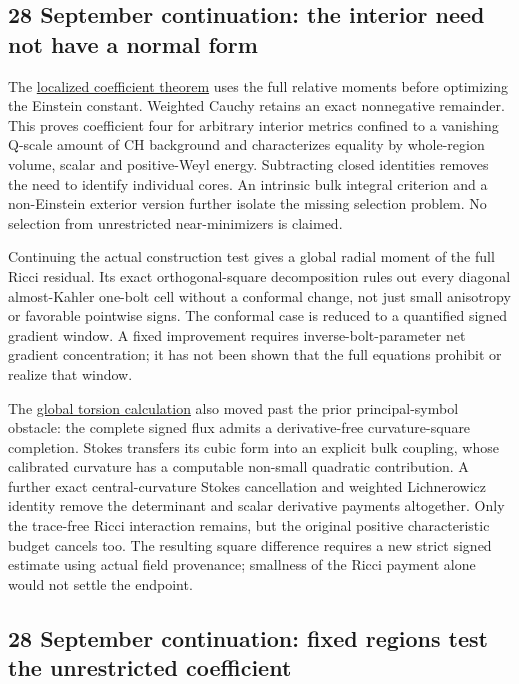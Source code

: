 \documentclass[
  10pt,
]{article}
\begin{document}
\hypertarget{september-continuation-the-interior-need-not-have-a-normal-form}{%
\subsection{28 September continuation: the interior need not have a
normal
form}\label{september-continuation-the-interior-need-not-have-a-normal-form}}

The
\href{../continuation/20260928_localization_and_coupled_filling.md}{localized
coefficient theorem} uses the full relative moments before optimizing
the Einstein constant. Weighted Cauchy retains an exact nonnegative
remainder. This proves coefficient four for arbitrary interior metrics
confined to a vanishing Q-scale amount of CH background and
characterizes equality by whole-region volume, scalar and positive-Weyl
energy. Subtracting closed identities removes the need to identify
individual cores. An intrinsic bulk integral criterion and a
non-Einstein exterior version further isolate the missing selection
problem. No selection from unrestricted near-minimizers is claimed.

Continuing the actual construction test gives a global radial moment of
the full Ricci residual. Its exact orthogonal-square decomposition rules
out every diagonal almost-Kahler one-bolt cell without a conformal
change, not just small anisotropy or favorable pointwise signs. The
conformal case is reduced to a quantified signed gradient window. A
fixed improvement requires inverse-bolt-parameter net gradient
concentration; it has not been shown that the full equations prohibit or
realize that window.

The \href{../continuation/20260928_signed_quartic_flux.md}{global
torsion calculation} also moved past the prior principal-symbol
obstacle: the complete signed flux admits a derivative-free
curvature-square completion. Stokes transfers its cubic form into an
explicit bulk coupling, whose calibrated curvature has a computable
non-small quadratic contribution. A further exact central-curvature
Stokes cancellation and weighted Lichnerowicz identity remove the
determinant and scalar derivative payments altogether. Only the
trace-free Ricci interaction remains, but the original positive
characteristic budget cancels too. The resulting square difference
requires a new strict signed estimate using actual field provenance;
smallness of the Ricci payment alone would not settle the endpoint.

\hypertarget{september-continuation-fixed-regions-test-the-unrestricted-coefficient}{%
\subsection{28 September continuation: fixed regions test the
unrestricted
coefficient}\label{september-continuation-fixed-regions-test-the-unrestricted-coefficient}}
\end{document}
